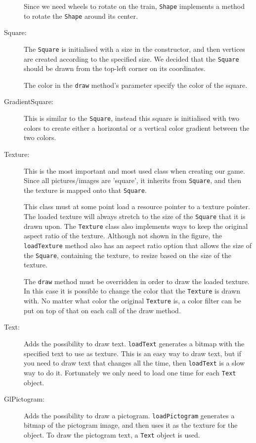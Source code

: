\begin{description}
Since we need wheels to rotate on the train, \lstinline|Shape| implements a method to rotate the \lstinline|Shape| around its center.

\item[Square:] The \lstinline|Square| is initialised with a size in the constructor, and then vertices are created according to the specified size. We decided that the \lstinline|Square| should be drawn from the top-left corner on its coordinates.

The color in the \lstinline|draw| method's parameter specify the color of the square.

\item[GradientSquare:] This is similar to the \lstinline|Square|, instead this square is initialised with two colors to create either a horizontal or a vertical color gradient between the two colors.

\item[Texture:] This is the most important and most used class when creating our game. Since all pictures/images are 'square', it inherits from \lstinline|Square|, and then the texture is mapped onto that \lstinline|Square|.

This class must at some point load a resource pointer to a texture pointer. The loaded texture will always stretch to the size of the \lstinline|Square| that it is drawn upon. The \lstinline|Texture| class also implements ways to keep the original aspect ratio of the texture. Although not shown in the figure, the \lstinline|loadTexture| method also has an aspect ratio option that allows the size of the \lstinline|Square|, containing the texture, to resize based on the size of the texture.

The \lstinline|draw| method must be overridden in order to draw the loaded texture. In this case it is possible to change the color that the \lstinline|Texture| is drawn with. No matter what color the original \lstinline|Texture| is, a color filter can be put on top of that on each call of the draw method.

\item[Text:] Adds the possibility to draw text. \lstinline|loadText| generates a bitmap with the specified text to use as texture. This is an easy way to draw text, but if you need to draw text that changes all the time, then \lstinline|loadText| is a slow way to do it. Fortunately we only need to load one time for each \lstinline|Text| object.

\item[GlPictogram:] Adds the possibility to draw a pictogram. \lstinline|loadPictogram| generates a bitmap of the pictogram image, and then uses it as the texture for the object. To draw the pictogram text, a \lstinline|Text| object is used.
\end{description}

